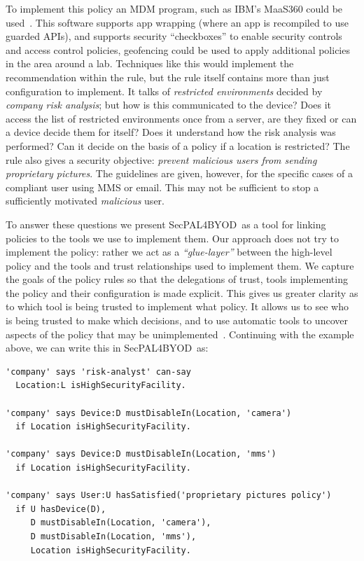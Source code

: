 \documentclass{llncs}
\newcommand{\AppPAL}[0]{SecPAL4BYOD}
\begin{document}
To implement this policy an \ac{MDM} program, such as IBM's MaaS360 could be used~\cite{_ibm_????}.
This software supports app wrapping (where an app is recompiled to use guarded APIs), and supports security ``checkboxes'' to enable security controls and access control policies, geofencing could be used to apply additional policies in the area around a lab.
Techniques like this would implement the recommendation within the rule, but the rule itself contains more than just configuration to implement.
It talks of \emph{restricted environments} decided by \emph{company risk analysis}; but how is this communicated to the device?
Does it access the list of restricted environments once from a server, are they fixed or can a device decide them for itself?
Does it understand how the risk analysis was performed?
Can it decide on the basis of a policy if a location is restricted?
The rule also gives a security objective: \emph{prevent malicious users from sending proprietary pictures}.
The guidelines are given, however, for the specific cases of a compliant user using MMS or email.
This may not be sufficient to stop a sufficiently motivated \emph{malicious} user.

To answer these questions we present \AppPAL{}~as a tool for linking policies to the tools we use to implement them.
Our approach does not try to implement the policy:
  rather we act as a \emph{``glue-layer''} between the high-level policy and the tools and trust relationships used to implement them.
We capture the goals of the policy rules so that the delegations of trust, tools implementing the policy and their configuration is made explicit.
This gives us greater clarity as to which tool is being trusted to implement what policy.
It allows us to see who is being trusted to make which decisions,
and to use automatic tools to uncover aspects of the policy that may be unimplemented~\cite{hallett_specifying_2016}.
Continuing with the example above, we can write this in \AppPAL~as:

\begin{lstlisting}
'company' says 'risk-analyst' can-say
  Location:L isHighSecurityFacility.

'company' says Device:D mustDisableIn(Location, 'camera')
  if Location isHighSecurityFacility.

'company' says Device:D mustDisableIn(Location, 'mms')
  if Location isHighSecurityFacility.

'company' says User:U hasSatisfied('proprietary pictures policy')
  if U hasDevice(D),
     D mustDisableIn(Location, 'camera'),
     D mustDisableIn(Location, 'mms'),
     Location isHighSecurityFacility.
\end{lstlisting}
\end{document}
